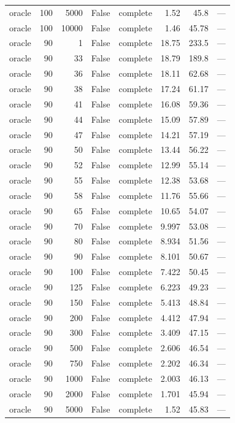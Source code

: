 \begin{tabular}{lrrrlrrl}
oracle & 100 & 5000 & False & complete & 1.52 & 45.8 & — \\
oracle & 100 & 10000 & False & complete & 1.46 & 45.78 & — \\
oracle & 90 & 1 & False & complete & 18.75 & 233.5 & — \\
oracle & 90 & 33 & False & complete & 18.79 & 189.8 & — \\
oracle & 90 & 36 & False & complete & 18.11 & 62.68 & — \\
oracle & 90 & 38 & False & complete & 17.24 & 61.17 & — \\
oracle & 90 & 41 & False & complete & 16.08 & 59.36 & — \\
oracle & 90 & 44 & False & complete & 15.09 & 57.89 & — \\
oracle & 90 & 47 & False & complete & 14.21 & 57.19 & — \\
oracle & 90 & 50 & False & complete & 13.44 & 56.22 & — \\
oracle & 90 & 52 & False & complete & 12.99 & 55.14 & — \\
oracle & 90 & 55 & False & complete & 12.38 & 53.68 & — \\
oracle & 90 & 58 & False & complete & 11.76 & 55.66 & — \\
oracle & 90 & 65 & False & complete & 10.65 & 54.07 & — \\
oracle & 90 & 70 & False & complete & 9.997 & 53.08 & — \\
oracle & 90 & 80 & False & complete & 8.934 & 51.56 & — \\
oracle & 90 & 90 & False & complete & 8.101 & 50.67 & — \\
oracle & 90 & 100 & False & complete & 7.422 & 50.45 & — \\
oracle & 90 & 125 & False & complete & 6.223 & 49.23 & — \\
oracle & 90 & 150 & False & complete & 5.413 & 48.84 & — \\
oracle & 90 & 200 & False & complete & 4.412 & 47.94 & — \\
oracle & 90 & 300 & False & complete & 3.409 & 47.15 & — \\
oracle & 90 & 500 & False & complete & 2.606 & 46.54 & — \\
oracle & 90 & 750 & False & complete & 2.202 & 46.34 & — \\
oracle & 90 & 1000 & False & complete & 2.003 & 46.13 & — \\
oracle & 90 & 2000 & False & complete & 1.701 & 45.94 & — \\
oracle & 90 & 5000 & False & complete & 1.52 & 45.83 & — \\

\end{tabular}
